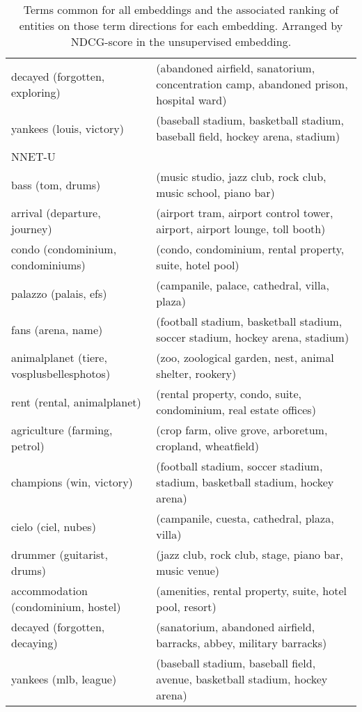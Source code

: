 \begin{table}[]
\begin{tabular}{ll}
		decayed (forgotten, exploring)             & (abandoned airfield, sanatorium, concentration camp, abandoned prison, hospital ward)  \\
		yankees (louis, victory)                   & (baseball stadium, basketball stadium, baseball field, hockey arena, stadium)          \\
		NNET-U                                     &                                                                                        \\
		bass (tom, drums)                          & (music studio, jazz club, rock club, music school, piano bar)                          \\
		arrival (departure, journey)               & (airport tram, airport control tower, airport, airport lounge, toll booth)             \\
		condo (condominium, condominiums)          & (condo, condominium, rental property, suite, hotel pool)                               \\
		palazzo (palais, efs)                      & (campanile, palace, cathedral, villa, plaza)                                           \\
		fans (arena, name)                         & (football stadium, basketball stadium, soccer stadium, hockey arena, stadium)          \\
		animalplanet (tiere, vosplusbellesphotos)  & (zoo, zoological garden, nest, animal shelter, rookery)                                \\
		rent (rental, animalplanet)                & (rental property, condo, suite, condominium, real estate offices)                      \\
		agriculture (farming, petrol)              & (crop farm, olive grove, arboretum, cropland, wheatfield)                              \\
		champions (win, victory)                   & (football stadium, soccer stadium, stadium, basketball stadium, hockey arena)          \\
		cielo (ciel, nubes)                        & (campanile, cuesta, cathedral, plaza, villa)                                           \\
		drummer (guitarist, drums)                 & (jazz club, rock club, stage, piano bar, music venue)                                  \\
		accommodation (condominium, hostel)        & (amenities, rental property, suite, hotel pool, resort)                                \\
		decayed (forgotten, decaying)              & (sanatorium, abandoned airfield, barracks, abbey, military barracks)                   \\
		yankees (mlb, league)                      & (baseball stadium, baseball field, avenue, basketball stadium, hockey arena)          
	\end{tabular}\caption{Terms common for all embeddings and the associated ranking of entities on those term directions for each embedding. Arranged by NDCG-score in the unsupervised embedding.}
\end{table}

